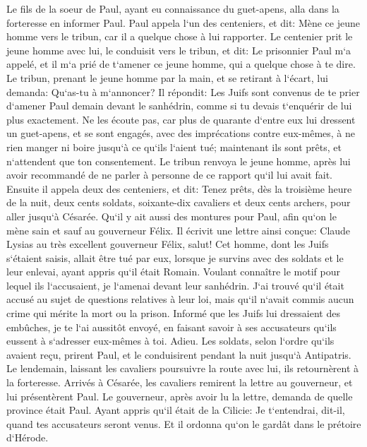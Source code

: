 \verse Le fils de la soeur de Paul, ayant eu connaissance du guet-apens, alla dans la forteresse en informer Paul. 
\verse Paul appela l`un des centeniers, et dit: Mène ce jeune homme vers le tribun, car il a quelque chose à lui rapporter. 
\verse Le centenier prit le jeune homme avec lui, le conduisit vers le tribun, et dit: Le prisonnier Paul m`a appelé, et il m`a prié de t`amener ce jeune homme, qui a quelque chose à te dire. 
\verse Le tribun, prenant le jeune homme par la main, et se retirant à l`écart, lui demanda: Qu`as-tu à m`annoncer? 
\verse Il répondit: Les Juifs sont convenus de te prier d`amener Paul demain devant le sanhédrin, comme si tu devais t`enquérir de lui plus exactement. 
\verse Ne les écoute pas, car plus de quarante d`entre eux lui dressent un guet-apens, et se sont engagés, avec des imprécations contre eux-mêmes, à ne rien manger ni boire jusqu`à ce qu`ils l`aient tué; maintenant ils sont prêts, et n`attendent que ton consentement. 
\verse Le tribun renvoya le jeune homme, après lui avoir recommandé de ne parler à personne de ce rapport qu`il lui avait fait. 
\verse Ensuite il appela deux des centeniers, et dit: Tenez prêts, dès la troisième heure de la nuit, deux cents soldats, soixante-dix cavaliers et deux cents archers, pour aller jusqu`à Césarée. 
\verse Qu`il y ait aussi des montures pour Paul, afin qu`on le mène sain et sauf au gouverneur Félix. 
\verse Il écrivit une lettre ainsi conçue: 
\verse Claude Lysias au très excellent gouverneur Félix, salut! 
\verse Cet homme, dont les Juifs s`étaient saisis, allait être tué par eux, lorsque je survins avec des soldats et le leur enlevai, ayant appris qu`il était Romain. 
\verse Voulant connaître le motif pour lequel ils l`accusaient, je l`amenai devant leur sanhédrin. 
\verse J`ai trouvé qu`il était accusé au sujet de questions relatives à leur loi, mais qu`il n`avait commis aucun crime qui mérite la mort ou la prison. 
\verse Informé que les Juifs lui dressaient des embûches, je te l`ai aussitôt envoyé, en faisant savoir à ses accusateurs qu`ils eussent à s`adresser eux-mêmes à toi. Adieu. 
\verse Les soldats, selon l`ordre qu`ils avaient reçu, prirent Paul, et le conduisirent pendant la nuit jusqu`à Antipatris. 
\verse Le lendemain, laissant les cavaliers poursuivre la route avec lui, ils retournèrent à la forteresse. 
\verse Arrivés à Césarée, les cavaliers remirent la lettre au gouverneur, et lui présentèrent Paul. 
\verse Le gouverneur, après avoir lu la lettre, demanda de quelle province était Paul. Ayant appris qu`il était de la Cilicie: 
\verse Je t`entendrai, dit-il, quand tes accusateurs seront venus. Et il ordonna qu`on le gardât dans le prétoire d`Hérode. 

